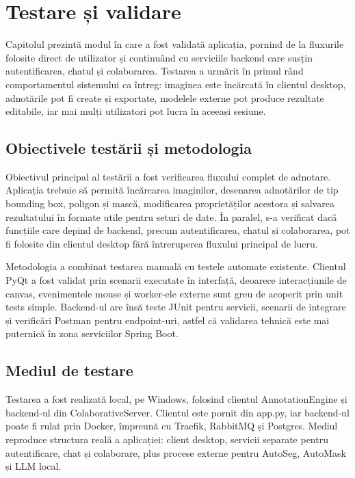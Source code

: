 \chapter{Testare și validare}
\pagestyle{fancy}

Capitolul prezintă modul în care a fost validată aplicația, pornind de la fluxurile folosite direct de utilizator și continuând cu serviciile backend care susțin autentificarea, chatul și colaborarea. Testarea a urmărit în primul rând comportamentul sistemului ca întreg: imaginea este încărcată în clientul desktop, adnotările pot fi create și exportate, modelele externe pot produce rezultate editabile, iar mai mulți utilizatori pot lucra în aceeași sesiune.

\section{Obiectivele testării și metodologia}

Obiectivul principal al testării a fost verificarea fluxului complet de adnotare. Aplicația trebuie să permită încărcarea imaginilor, desenarea adnotărilor de tip bounding box, poligon și mască, modificarea proprietăților acestora și salvarea rezultatului în formate utile pentru seturi de date. În paralel, s-a verificat dacă funcțiile care depind de backend, precum autentificarea, chatul și colaborarea, pot fi folosite din clientul desktop fără întreruperea fluxului principal de lucru.

Metodologia a combinat testarea manuală cu testele automate existente. Clientul PyQt a fost validat prin scenarii executate în interfață, deoarece interacțiunile de canvas, evenimentele mouse și worker-ele externe sunt greu de acoperit prin unit tests simple. Backend-ul are însă teste JUnit pentru servicii, scenarii de integrare și verificări Postman pentru endpoint-uri, astfel că validarea tehnică este mai puternică în zona serviciilor Spring Boot.

\section{Mediul de testare}

Testarea a fost realizată local, pe Windows, folosind clientul AnnotationEngine și backend-ul din ColaborativeServer. Clientul este pornit din app.py, iar backend-ul poate fi rulat prin Docker, împreună cu Traefik, RabbitMQ și Postgres. Mediul reproduce structura reală a aplicației: client desktop, servicii separate pentru autentificare, chat și colaborare, plus procese externe pentru AutoSeg, AutoMask și LLM local.

